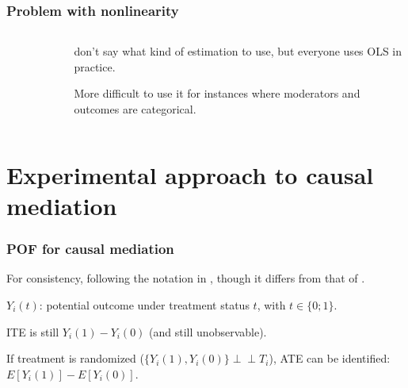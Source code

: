 \documentclass[11pt,english,dvipsnames,aspectratio=169,handout]{beamer}\usepackage[]{graphicx}\usepackage[]{xcolor}
\newcommand{\indep}{\perp \!\!\!\! \perp}
\begin{document}
\begin{frame}
	\frametitle{Problem with nonlinearity}
	
	\begin{columns}
		\begin{column}{0.45\textwidth}
			\begin{figure}
				\label{fig:05}
			\end{figure}
			\footnotesize
			
		\end{column}
		\pause
		\begin{column}{0.55\textwidth}
			\footnotesize
			
			 don't say what kind of estimation to use, but everyone uses OLS in practice.\bigskip
			\pause
			
			More difficult to use it for instances where moderators and outcomes are categorical.
			
		\end{column}
	\end{columns}

\end{frame}



\section{Experimental approach to causal mediation}

\begin{frame}
	\frametitle{POF for causal mediation}
	For consistency, following the notation in , though it differs from that of .\bigskip
	\pause
	
	$Y_i(t)$: potential outcome under treatment status $t$, with $t \in \{0;1\}$.\bigskip
	
	ITE is still $Y_i(1) - Y_i(0)$ (and still unobservable).\bigskip
	\pause
	
	If treatment is randomized ($\{Y_i(1),Y_i(0)\} \indep T_i$), ATE can be identified: $E[Y_i(1)] - E[Y_i(0)]$. 
	
\end{frame}
\end{document}
